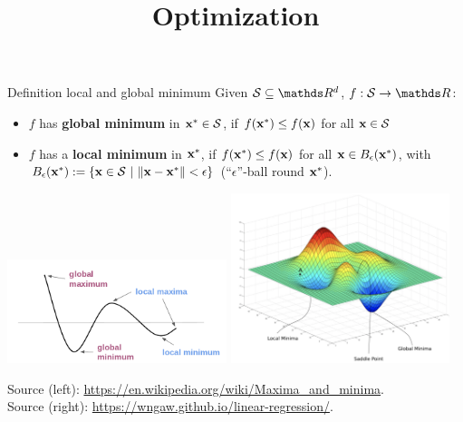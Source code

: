 \documentclass[11pt,compress,t,notes=noshow, xcolor=table]{beamer}
\title{Optimization}
\date{}
\begin{document}
\sloppy

\begin{vbframe}{Definition local and global minimum}
  Given $\mathcal{S} \subseteq \R^d$, $f: \mathcal{S} \to \R$:
  \begin{itemize}
  \item $f$ has \textbf{global minimum} in $\mathbf{x}^\ast \in \mathcal{S}$, if $f(\mathbf{x}^\ast) \leq f(\mathbf{x})$ for all $\mathbf{x} \in \mathcal{S}$
  \item $f$ has a \textbf{local minimum} in $\mathbf{x}^\ast$, if $f(\mathbf{x}^\ast) \leq f(\mathbf{x})$ for all $\mathbf{x} \in B_\epsilon(\mathbf{x}^\ast)$, with $B_\epsilon(\mathbf{x}^\ast) := \{\mathbf{x} \in \mathcal{S} ~|~\|\mathbf{x} - \mathbf{x}^\ast\| < \epsilon\}$ (\enquote{$\epsilon$}-ball round $\mathbf{x}^\ast$).  
  \end{itemize}
  
  \vspace*{-0.3cm}
  
  \begin{center}
  \includegraphics[width = 0.48\textwidth]{figure_man/local_global_min.png} \quad \includegraphics[width = 0.48\textwidth]{figure_man/local_global_min_2D.png} \\
  \vspace*{0.3cm}
  \begin{tiny}
    Source (left): \url{https://en.wikipedia.org/wiki/Maxima_and_minima}. \\ Source (right): \url{https://wngaw.github.io/linear-regression/}. 
  \end{tiny}
  \end{center}
  
  \end{vbframe}
  
\end{document}
